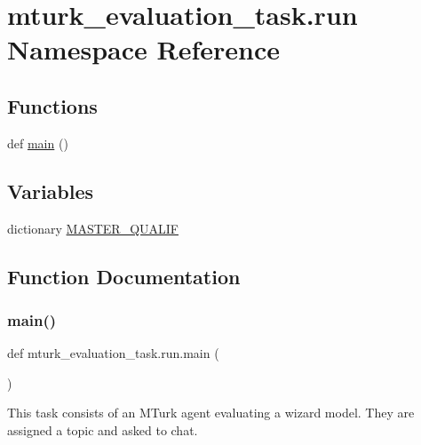 \hypertarget{namespacemturk__evaluation__task_1_1run}{}\section{mturk\+\_\+evaluation\+\_\+task.\+run Namespace Reference}
\label{namespacemturk__evaluation__task_1_1run}
\subsection*{Functions}
\begin{DoxyCompactItemize}
\item 
def \hyperlink{namespacemturk__evaluation__task_1_1run_abf2de8d01fae9d5ced027d42bd2104ec}{main} ()
\end{DoxyCompactItemize}
\subsection*{Variables}
\begin{DoxyCompactItemize}
\item 
dictionary \hyperlink{namespacemturk__evaluation__task_1_1run_adf576b3c37139529f3d213bedd51a6d3}{M\+A\+S\+T\+E\+R\+\_\+\+Q\+U\+A\+L\+IF}
\end{DoxyCompactItemize}


\subsection{Function Documentation}
\mbox{\label{namespacemturk__evaluation__task_1_1run_abf2de8d01fae9d5ced027d42bd2104ec}} 
\subsubsection{\texorpdfstring{main()}{main()}}
{\footnotesize\ttfamily def mturk\+\_\+evaluation\+\_\+task.\+run.\+main (\begin{DoxyParamCaption}{ }\end{DoxyParamCaption})}

\begin{DoxyVerb}This task consists of an MTurk agent evaluating a wizard model. They
are assigned a topic and asked to chat.
\end{DoxyVerb}
 

